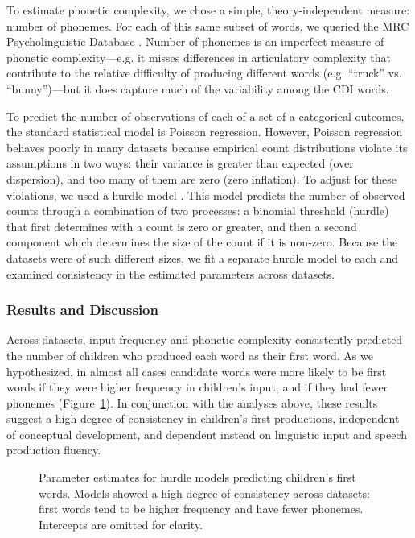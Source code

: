 \documentclass[10pt,letterpaper]{article}
\begin{document}
To estimate phonetic complexity, we chose a simple, theory-independent measure: number of phonemes. For each of this same subset of words, we queried the MRC Psycholinguistic Database \cite{Wilson1988}. Number of phonemes is an imperfect measure of phonetic complexity---e.g. it misses differences in articulatory complexity that contribute to the relative difficulty of producing different words (e.g. ``truck'' vs. ``bunny'')---but it does capture much of the variability among the CDI words.

To predict the number of observations of each of a set of a categorical outcomes, the standard statistical model is Poisson regression.  However, Poisson regression behaves poorly in many datasets because empirical count distributions violate its assumptions in two ways: their variance is greater than expected (over dispersion), and too many of them are zero (zero inflation). To adjust for these violations, we used a hurdle model  \cite{mullahy1986}. This model predicts the number of observed counts through a combination of two processes: a binomial threshold (hurdle) that first determines with a count is zero or greater, and then a second component which determines the size of the count if it is non-zero. Because the datasets were of such different sizes, we fit a separate hurdle model to each and examined consistency in the estimated parameters across datasets.

\subsubsection{Results and Discussion}

Across datasets, input frequency and phonetic complexity consistently predicted the number of children who produced each word as their first word. As we hypothesized, in almost all cases candidate words were more likely to be first words if they were higher frequency in children's input, and if they had fewer phonemes (Figure~\ref{fig:hurdles}). In conjunction with the analyses above, these results suggest a high degree of consistency in children's first productions, independent of conceptual development, and dependent instead on linguistic input and speech production fluency.

\begin{figure}[tb]
\caption{\label{fig:hurdles} Parameter estimates for hurdle models predicting children's first words. Models showed a high degree of consistency across datasets: first words tend to be higher frequency and have fewer phonemes. Intercepts are omitted for clarity.}
\end{figure}
\end{document}
